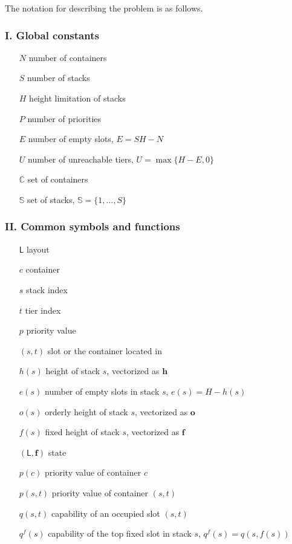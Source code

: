 \documentclass[review,3p,times,12pt,number]{elsarticle}\usepackage{amsmath}\usepackage{amssymb}
\begin{document}
\newlength{\mylongest}
\settowidth{\mylongest}{$\alpha(s^+,s)$}
\addtolength{\mylongest}{\labelsep}

The notation for describing the problem is as follows.

\subsubsection*{I\@. Global constants}

\begin{enumerate}[noitemsep, align=LabelCenter,labelwidth=\mylongest,leftmargin=!]
\item[$N$] number of containers
\item[$S$] number of stacks
\item[$H$] height limitation of stacks
\item[$P$] number of priorities
\item[$E$] number of empty slots, $E=SH-N$
\item[$U$] number of unreachable tiers, $U=\max\{H-E,0\}$
\item[$\mathbb{C}$] set of containers
\item[$\mathbb{S}$] set of stacks, $\mathbb{S}=\{1,\dots,S\}$
\end{enumerate}



\subsubsection*{II\@. Common symbols and functions}
\begin{enumerate}[noitemsep, align=LabelCenter,labelwidth=\mylongest,leftmargin=!]
\item[$\mathsf{L}$] layout
\item[$c$] container
\item[$s$] stack index
\item[$t$] tier index
\item[$p$] priority value
\item[$(s, t)$] slot or the container located in
\item[$h(s)$] height of stack $s$, vectorized as $\boldsymbol{h}$
\item[$e(s)$] number of empty slots in stack $s$, $e(s)=H-h(s)$
\item[$o(s)$] orderly height of stack $s$, vectorized as $\boldsymbol{o}$
\item[$f(s)$] fixed height of stack $s$, vectorized as $\boldsymbol{f}$
\item[$(\mathsf{L},\boldsymbol{f})$] state
\item[$p(c)$] priority value of container $c$
\item[$p(s,t)$] priority value of container $(s,t)$
\item[$q(s,t)$] capability of an occupied slot $(s,t)$
\item[$q^f(s)$] capability of the top fixed slot in stack $s$, $q^f(s)=q(s,f(s))$
\end{enumerate}
\end{document}
